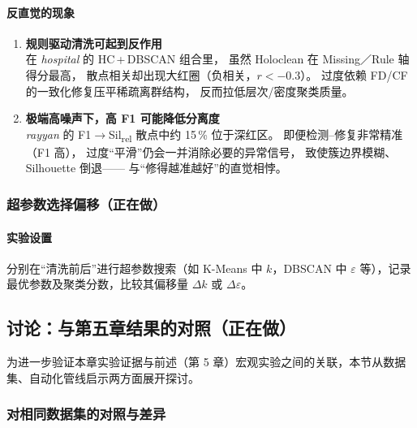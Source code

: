 \documentclass[10pt]{article} %
\numberwithin{equation}{section}
\begin{document}
\paragraph{反直觉的现象}
\begin{enumerate}[label=\textbf{\arabic*.},leftmargin=1.6em,itemsep=3pt]
  \item \textbf{规则驱动清洗可起到反作用 \\}  
        在 \emph{hospital} 的 HC\,+\,DBSCAN 组合里，%
        虽然 Holoclean 在 Missing／Rule 轴得分最高，%
        散点相关却出现大红圈（负相关，$r<-0.3$）。%
        过度依赖 FD/CF 的一致化修复压平稀疏离群结构，%
        反而拉低层次/密度聚类质量。

  \item \textbf{极端高噪声下，高 F1 可能降低分离度 \\}  
        \emph{rayyan} 的 F1$\!\rightarrow\!$Sil\textsubscript{rel} %
        散点中约 15\,\% 位于深红区。%
        即便检测–修复非常精准（F1 高），%
        过度“平滑”仍会一并消除必要的异常信号，%
        致使簇边界模糊、Silhouette 倒退——%
        与“修得越准越好”的直觉相悖。
\end{enumerate}

\subsubsection{超参数选择偏移（正在做）}
\label{subsec:param_shift}

\paragraph{实验设置}
分别在“清洗前后”进行超参数搜索（如 K-Means 中 $k$，DBSCAN 中 $\varepsilon$ 等），记录最优参数及聚类分数，比较其偏移量 \(\Delta k\) 或 \(\Delta \varepsilon\)。

\subsection{讨论：与第五章结果的对照（正在做）}
\label{sec:discussion}

为进一步验证本章实验证据与前述（第 5 章）宏观实验之间的关联，本节从数据集、自动化管线启示两方面展开探讨。

\subsubsection{对相同数据集的对照与差异}
\label{subsec:discussion_data}
\end{document}
